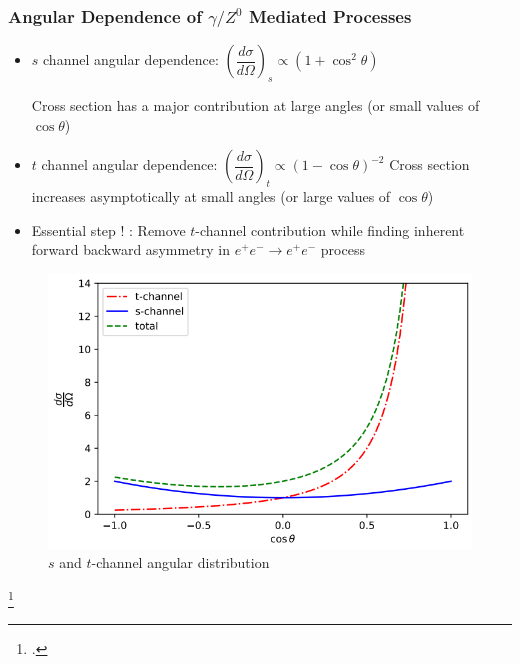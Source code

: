 \documentclass[10pt]{beamer}
\begin{document}
\begin{frame}
\frametitle{Angular Dependence of $\gamma / Z^{0}$ Mediated Processes}
\begin{minipage}{0.5\textwidth}
\begin{itemize}
\item $s$ channel angular dependence: $\left(\dfrac{d\sigma}{d\Omega}\right)_{s}\propto (1+\cos^{2}\theta)$

Cross section has a major contribution at large angles (or small values of $\cos\theta$)
\item $t$ channel angular dependence: $\left(\dfrac{d\sigma}{d\Omega}\right)_{t}\propto (1-\cos\theta)^{-2}$
Cross section increases asymptotically at small angles (or large values of $\cos\theta$)\footnotemark{}
\item Essential step ! : Remove $t$-channel contribution while finding inherent forward backward asymmetry in $e^{+}e^{-}\rightarrow e^{+}e^{-}$ process
\end{itemize}
\end{minipage}\hspace{1em}
\begin{minipage}{0.45\textwidth}
\begin{figure}
\centering
\includegraphics[width=\textwidth]{tangulardist}
\caption{$s$ and $t$-channel angular distribution}
\end{figure}
\end{minipage}\hfill
\footcitetext{UB}
\end{frame}
\end{document}
